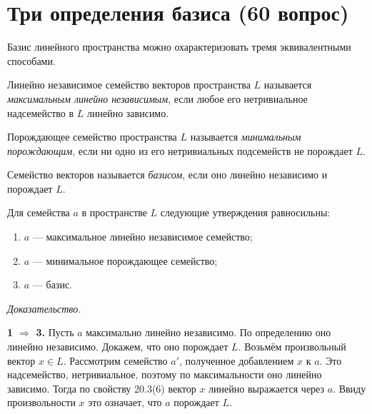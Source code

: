 \documentclass[a4paper,12pt]{article}
\theoremstyle{definition}
\theoremstyle{plain}
\theoremstyle{remark}
\begin{document}
	
	
	
	
	\newpage
	\section{Три определения базиса (60 вопрос)}
	
	Базис линейного пространства можно охарактеризовать тремя эквивалентными способами.
	
	\begin{tcolorbox}[colback=blue!5, colframe=blue!40!black, title=Определение 1 (Максимальное линейно независимое семейство)]
		Линейно независимое семейство векторов пространства \( L \) называется \textit{максимальным линейно независимым}, если любое его нетривиальное надсемейство в \( L \) линейно зависимо.
	\end{tcolorbox}
	
	\begin{tcolorbox}[colback=blue!5, colframe=blue!40!black, title=Определение 2 (Минимальное порождающее семейство)]
		Порождающее семейство пространства \( L \) называется \textit{минимальным порождающим}, если ни одно из его нетривиальных подсемейств не порождает \( L \).
	\end{tcolorbox}
	
	\begin{tcolorbox}[colback=blue!5, colframe=blue!40!black, title=Определение 3 (Базис в обычном смысле)]
		Семейство векторов называется \textit{базисом}, если оно линейно независимо и порождает \( L \).
	\end{tcolorbox}
	
	\begin{tcolorbox}[colback=red!5, colframe=red!50!black, title=Предложение 21.9]
		Для семейства \( a \) в пространстве \( L \) следующие утверждения равносильны:
		\begin{enumerate}
			\item \( a \) — максимальное линейно независимое семейство;
			\item \( a \) — минимальное порождающее семейство;
			\item \( a \) — базис.
		\end{enumerate}
	\end{tcolorbox}
	
	\medskip
	\textit{Доказательство.}
	
	\textbf{1 \(\Rightarrow\) 3.} Пусть \( a \) максимально линейно независимо. По определению оно линейно независимо. Докажем, что оно порождает \( L \). Возьмём произвольный вектор \( x \in L \). Рассмотрим семейство \( a' \), полученное добавлением \( x \) к \( a \). Это надсемейство, нетривиальное, поэтому по максимальности оно линейно зависимо. Тогда по свойству 20.3(6) вектор \( x \) линейно выражается через \( a \). Ввиду произвольности \( x \) это означает, что \( a \) порождает \( L \).
	
\end{document}
